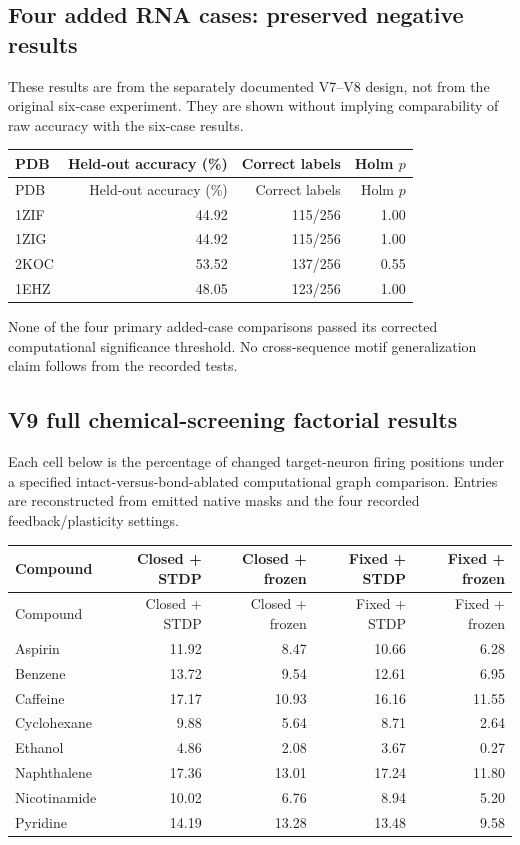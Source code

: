\documentclass[11pt,a4paper]{article}
\begin{document}
\subsection{Four added RNA cases: preserved negative results}
These results are from the separately documented V7--V8 design, not from the original six-case experiment. They are shown without implying comparability of raw accuracy with the six-case results.
\begin{center}\footnotesize
\begin{longtable}{lrrr}
\toprule
PDB & Held-out accuracy (\%) & Correct labels & Holm $p$\\
\midrule
\endfirsthead
\toprule
PDB & Held-out accuracy (\%) & Correct labels & Holm $p$\\
\midrule
\endhead
1ZIF & 44.92 & 115/256 & 1.00\\
1ZIG & 44.92 & 115/256 & 1.00\\
2KOC & 53.52 & 137/256 & 0.55\\
1EHZ & 48.05 & 123/256 & 1.00\\
\bottomrule
\end{longtable}
\end{center}

None of the four primary added-case comparisons passed its corrected computational significance threshold. No cross-sequence motif generalization claim follows from the recorded tests.

\subsection{V9 full chemical-screening factorial results}
Each cell below is the percentage of changed target-neuron firing positions under a specified intact-versus-bond-ablated computational graph comparison. Entries are reconstructed from emitted native masks and the four recorded feedback/plasticity settings.
\begin{center}\footnotesize
\begin{longtable}{lrrrr}
\toprule
Compound & Closed + STDP & Closed + frozen & Fixed + STDP & Fixed + frozen\\
\midrule
\endfirsthead
\toprule
Compound & Closed + STDP & Closed + frozen & Fixed + STDP & Fixed + frozen\\
\midrule
\endhead
Aspirin & 11.92 & 8.47 & 10.66 & 6.28\\
Benzene & 13.72 & 9.54 & 12.61 & 6.95\\
Caffeine & 17.17 & 10.93 & 16.16 & 11.55\\
Cyclohexane & 9.88 & 5.64 & 8.71 & 2.64\\
Ethanol & 4.86 & 2.08 & 3.67 & 0.27\\
Naphthalene & 17.36 & 13.01 & 17.24 & 11.80\\
Nicotinamide & 10.02 & 6.76 & 8.94 & 5.20\\
Pyridine & 14.19 & 13.28 & 13.48 & 9.58\\
\bottomrule
\end{longtable}
\end{center}
\end{document}
